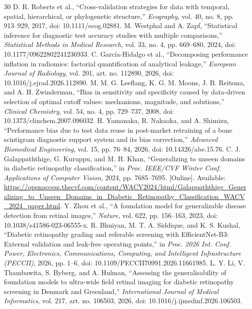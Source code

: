 \documentclass{ieeeaccess}
\begin{document}
\begin{thebibliography}{30}
 D. R. Roberts et al., ``Cross-validation strategies for data with temporal, spatial, hierarchical, or phylogenetic structure,'' \emph{Ecography}, vol. 40, no. 8, pp. 913--929, 2017, doi: 10.1111/ecog.02881.
 M. Westphal and A. Zapf, ``Statistical inference for diagnostic test accuracy studies with multiple comparisons,'' \emph{Statistical Methods in Medical Research}, vol. 33, no. 4, pp. 669--680, 2024, doi: 10.1177/09622802241236933.
 C. Garc\'ia-Hidalgo et al., ``Decomposing performance inflation in radiomics: factorial quantification of analytical leakage,'' \emph{European Journal of Radiology}, vol. 201, art. no. 112890, 2026, doi: 10.1016/j.ejrad.2026.112890.
 M. M. G. Leeflang, K. G. M. Moons, J. B. Reitsma, and A. H. Zwinderman, ``Bias in sensitivity and specificity caused by data-driven selection of optimal cutoff values: mechanisms, magnitude, and solutions,'' \emph{Clinical Chemistry}, vol. 54, no. 4, pp. 729--737, 2008, doi: 10.1373/clinchem.2007.096032.
 H. Yamanaka, R. Nakaoka, and A. Shimizu, ``Performance bias due to test data reuse in post-market retraining of a bone scintigram diagnostic support system and its bias correction,'' \emph{Advanced Biomedical Engineering}, vol. 15, pp. 76--84, 2026, doi: 10.14326/abe.15.76.
 C. J. Galappaththige, G. Kuruppu, and M. H. Khan, ``Generalizing to unseen domains in diabetic retinopathy classification,'' in \emph{Proc. IEEE/CVF Winter Conf. Applications of Computer Vision}, 2024, pp. 7685--7695. [Online]. Available: \url{https://openaccess.thecvf.com/content/WACV2024/html/Galappaththige_Generalizing_to_Unseen_Domains_in_Diabetic_Retinopathy_Classification_WACV_2024_paper.html}.
 Y. Zhou et al., ``A foundation model for generalizable disease detection from retinal images,'' \emph{Nature}, vol. 622, pp. 156--163, 2023, doi: 10.1038/s41586-023-06555-x.
 R. Bhuiyan, M. T. A. Siddique, and K. S. Kushal, ``Diabetic retinopathy grading and referable screening with EfficientNet-B3: External validation and leak-free operating points,'' in \emph{Proc. 2026 Int. Conf. Power, Electronics, Communications, Computing, and Intelligent Infrastructure (PECCII)}, 2026, pp. 1--6, doi: 10.1109/PECCII70991.2026.11661985.
 L. Y. Li, V. Thambawita, S. Byberg, and A. Hulman, ``Assessing the generalisability of foundation models to ultra-wide field retinal imaging for diabetic retinopathy screening in Denmark and Greenland,'' \emph{International Journal of Medical Informatics}, vol. 217, art. no. 106503, 2026, doi: 10.1016/j.ijmedinf.2026.106503.

\end{thebibliography}
\end{document}
